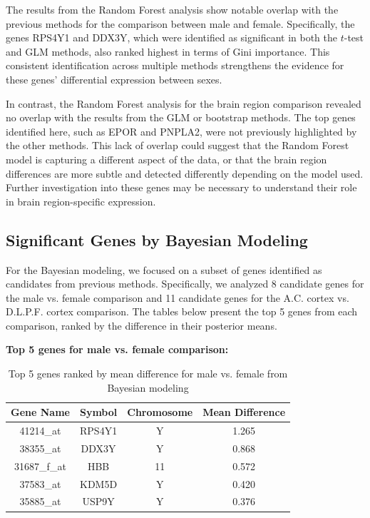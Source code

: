 \documentclass[12pt]{article}
\begin{document}
The results from the Random Forest analysis show notable overlap with the previous methods for the comparison between male and female. Specifically, the genes RPS4Y1 and DDX3Y, which were identified as significant in both the $t$-test and GLM methods, also ranked highest in terms of Gini importance. This consistent identification across multiple methods strengthens the evidence for these genes' differential expression between sexes.

In contrast, the Random Forest analysis for the brain region comparison revealed no overlap with the results from the GLM or bootstrap methods. The top genes identified here, such as EPOR and PNPLA2, were not previously highlighted by the other methods. This lack of overlap could suggest that the Random Forest model is capturing a different aspect of the data, or that the brain region differences are more subtle and detected differently depending on the model used. Further investigation into these genes may be necessary to understand their role in brain region-specific expression.

\subsection{Significant Genes by Bayesian Modeling}

For the Bayesian modeling, we focused on a subset of genes identified as candidates from previous methods. Specifically, we analyzed 8 candidate genes for the male vs. female comparison and 11 candidate genes for the A.C. cortex vs. D.L.P.F. cortex comparison. The tables below present the top 5 genes from each comparison, ranked by the difference in their posterior means.

\textbf{Top 5 genes for male vs. female comparison:}

\begin{table}[h!]
\centering
\begin{tabular}{|c|c|c|c|}
\hline
\textbf{Gene Name} & \textbf{Symbol} & \textbf{Chromosome} & \textbf{Mean Difference} \\
\hline
41214\_at & RPS4Y1 & Y & 1.265 \\
38355\_at & DDX3Y & Y & 0.868 \\
31687\_f\_at & HBB & 11 & 0.572 \\
37583\_at & KDM5D & Y & 0.420 \\
35885\_at & USP9Y & Y & 0.376 \\
\hline
\end{tabular}
\caption{Top 5 genes ranked by mean difference for male vs. female from Bayesian modeling}
\end{table}
\end{document}
